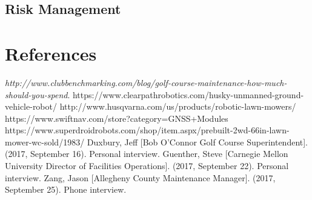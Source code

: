 \documentclass[12pt]{extarticle}
\begin{document}
\subsection{Risk Management}
\newpage
\section{References}
\begin{thebibliography}{1}
\textit{http://www.clubbenchmarking.com/blog/golf-course-maintenance-how-much-should-you-spend}. 
https://www.clearpathrobotics.com/husky-unmanned-ground-vehicle-robot/
http://www.husqvarna.com/us/products/robotic-lawn-mowers/
https://www.swiftnav.com/store?category=GNSS+Modules
https://www.superdroidrobots.com/shop/item.aspx/prebuilt-2wd-66in-lawn-mower-wc-sold/1983/
Duxbury, Jeff [Bob O’Connor Golf Course Superintendent]. (2017, September 16). Personal interview.
Guenther, Steve [Carnegie Mellon University Director of Facilities Operations]. (2017, September 22). Personal interview.
Zang, Jason [Allegheny County Maintenance Manager]. (2017, September 25). Phone interview.
\end{thebibliography}
\end{document}
